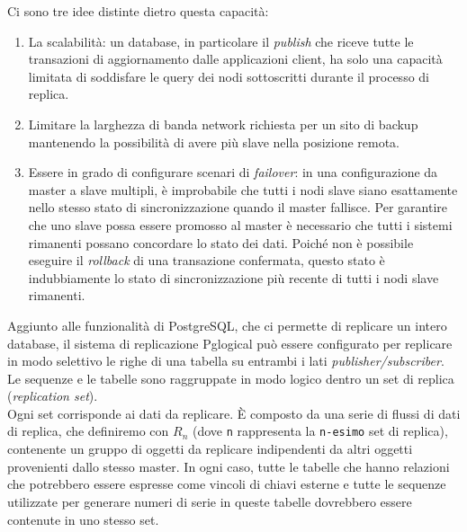 Ci sono tre idee distinte dietro questa capacit\`{a}:
\begin{enumerate}
\item 
La scalabilit\`{a}: un database, in particolare il \textit{publish} che riceve tutte le transazioni di aggiornamento dalle applicazioni client, ha solo una capacit\`{a} limitata di soddisfare le query dei nodi sottoscritti durante il processo di replica. 
\item
Limitare la larghezza di banda network richiesta per un sito di backup mantenendo la possibilit\`{a} di avere pi\`{u} slave nella posizione remota.
\item
Essere in grado di configurare scenari di \textit{failover}: in una configurazione da master a slave multipli, \`{e} improbabile che tutti i nodi slave siano esattamente nello stesso stato di sincronizzazione quando il master fallisce. Per garantire che uno slave possa essere promosso al master \`{e} necessario che tutti i sistemi rimanenti possano concordare lo stato dei dati. Poich\'{e} non \`{e} possibile eseguire il \textit{rollback} di una transazione confermata, questo stato \`{e} indubbiamente lo stato di sincronizzazione pi\`{u} recente di tutti i nodi slave rimanenti.\\
\end{enumerate}


Aggiunto alle funzionalit\`{a} di PostgreSQL, che ci permette di replicare un intero database, il sistema di replicazione Pglogical pu\`{o} essere configurato per replicare in modo selettivo le righe di una tabella su entrambi i lati \textit{publisher/subscriber}.\\

Le sequenze e le tabelle sono raggruppate in modo logico dentro un set di replica (\textit{replication set}). \\
Ogni set corrisponde ai dati da replicare. \`{E} composto da una serie di flussi di dati di replica, che definiremo con $R_n$ (dove \verb"n" rappresenta la \verb"n-esimo" set di replica), contenente un gruppo di oggetti da replicare indipendenti da altri oggetti provenienti dallo stesso master. In ogni caso, tutte le tabelle che hanno relazioni che potrebbero essere espresse come vincoli di chiavi esterne e tutte le sequenze utilizzate per generare numeri di serie in queste tabelle dovrebbero essere contenute in uno stesso set.

